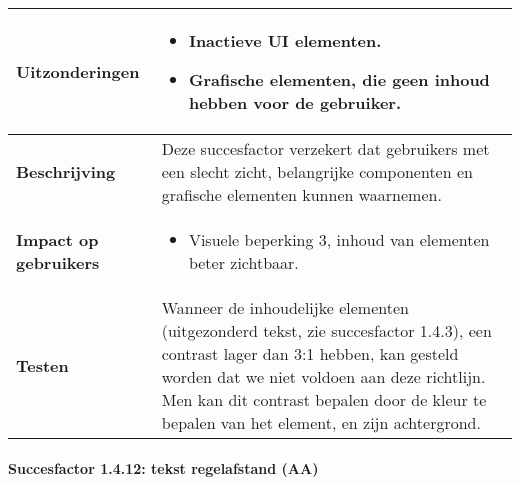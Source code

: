 \begin{table}[H]
\begin{tabular}{|l|p{12cm}|}
          \hline
        \textbf{Uitzonderingen}     & 
        \begin{itemize}
            \item Inactieve UI elementen.
            \item Grafische elementen, die geen inhoud hebben voor de gebruiker.
        \end{itemize}                                                                                                                                                                                                   \\ 
            \hline
            \textbf{Beschrijving}                 & Deze succesfactor verzekert dat gebruikers met een slecht zicht, belangrijke componenten en grafische elementen kunnen waarnemen.  \\ 
            \hline
            \textbf{Impact op gebruikers}         &  
            \begin{itemize}
                \item Visuele beperking 3, inhoud van elementen beter zichtbaar.
            \end{itemize}                                                                                                                                                                                                                                                                                                                                                                                                                    \\ 
            \hline
            \textbf{Testen}                       & Wanneer de inhoudelijke elementen (uitgezonderd tekst, zie succesfactor 1.4.3),  een contrast lager  dan 3:1 hebben, kan gesteld worden dat we niet voldoen aan deze richtlijn. Men kan dit contrast bepalen door de kleur te bepalen van het element, en zijn achtergrond.                                                                                                                                                                                                                  \\
            \hline
        \end{tabular}
        
\end{table}



\paragraph{Succesfactor 1.4.12:  tekst regelafstand (AA)}
